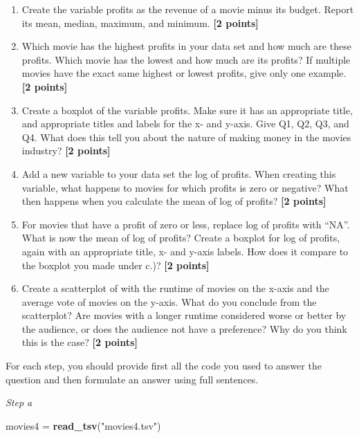 \documentclass[
]{article}
\newenvironment{Shaded}{\begin{snugshade}}{\end{snugshade}}
\newcommand{\FunctionTok}[1]{\textcolor[rgb]{0.13,0.29,0.53}{\textbf{#1}}}
\newcommand{\NormalTok}[1]{#1}
\newcommand{\OtherTok}[1]{\textcolor[rgb]{0.56,0.35,0.01}{#1}}
\newcommand{\StringTok}[1]{\textcolor[rgb]{0.31,0.60,0.02}{#1}}
\providecommand{\tightlist}{%
  \setlength{\itemsep}{0pt}\setlength{\parskip}{0pt}}
\begin{document}
\begin{enumerate}
\def\labelenumi{\alph{enumi}.}
\tightlist
\item
  Create the variable profits as the revenue of a movie minus its
  budget. Report its mean, median, maximum, and minimum.
  \textbf{[2 points]}
\item
  Which movie has the highest profits in your data set and how much are
  these profits. Which movie has the lowest and how much are its
  profits? If multiple movies have the exact same highest or lowest
  profits, give only one example. \textbf{[2 points]}
\item
  Create a boxplot of the variable profits. Make sure it has an
  appropriate title, and appropriate titles and labels for the x- and
  y-axis. Give Q1, Q2, Q3, and Q4. What does this tell you about the
  nature of making money in the movies industry? \textbf{[2 points]}
\item
  Add a new variable to your data set the log of profits. When creating
  this variable, what happens to movies for which profits is zero or
  negative? What then happens when you calculate the mean of log of
  profits? \textbf{[2 points]}
\item
  For movies that have a profit of zero or less, replace log of profits
  with ``NA''. What is now the mean of log of profits? Create a boxplot
  for log of profits, again with an appropriate title, x- and y-axis
  labels. How does it compare to the boxplot you made under c.)?
  \textbf{[2 points]}
\item
  Create a scatterplot of with the runtime of movies on the x-axis and
  the average vote of movies on the y-axis. What do you conclude from
  the scatterplot? Are movies with a longer runtime considered worse or
  better by the audience, or does the audience not have a preference?
  Why do you think this is the case? \textbf{[2 points]}
\end{enumerate}

For each step, you should provide first all the code you used to answer
the question and then formulate an answer using full sentences.

\emph{Step a}

\begin{Shaded}
\begin{Highlighting}[]
\NormalTok{movies4 }\OtherTok{=} \FunctionTok{read\_tsv}\NormalTok{(}\StringTok{"movies4.tsv"}\NormalTok{)}
\end{Highlighting}
\end{Shaded}
\end{document}

